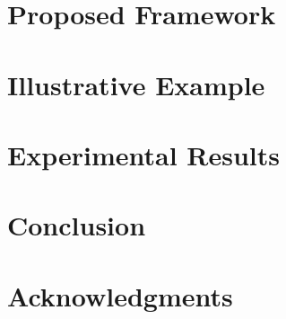 \documentclass[journal]{IEEEtran}
\begin{document}
  \section{Proposed Framework} 
  

  \section{Illustrative Example} 
  

  \section{Experimental Results} 
  

  \section{Conclusion} 
  

  \section*{Acknowledgments}
  

  \begingroup
  \setlength\bibitemsep{2pt}
  \printbibliography
  \endgroup

  \appendix
  
\end{document}
